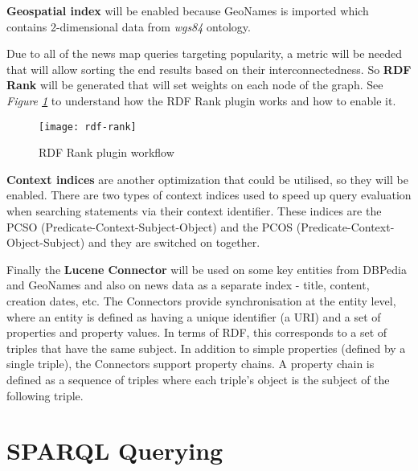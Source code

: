 \textbf{Geospatial index} will be enabled because GeoNames is imported which contains 2-dimensional data from \textit{wgs84} ontology.

Due to all of the news map queries targeting popularity,  a metric will be needed that will allow sorting the end results based on their interconnectedness. So \textbf{RDF Rank} will be generated that will set weights on each node of the graph. See \textit{Figure \ref{rdf-rank}} to understand how the RDF Rank plugin works and how to enable it.

\begin{figure}[h!]
    \texttt{[image: rdf-rank]}
    \caption{RDF Rank plugin workflow}
    \label{rdf-rank}
\end{figure}

\textbf{Context indices} are another optimization that could be utilised, so they will be enabled. There are two types of context indices used to speed up query evaluation when searching statements via their context identifier. These indices are the PCSO (Predicate-Context-Subject-Object) and the PCOS (Predicate-Context-Object-Subject) and they are switched on together.

Finally the \textbf{Lucene Connector} will be used on some key entities from DBPedia and GeoNames and also on news data as a separate index - title, content, creation dates, etc. The Connectors provide synchronisation at the entity level, where an entity is defined as having a unique identifier (a URI) and a set of properties and property values. In terms of RDF, this corresponds to a set of triples that have the same subject. In addition to simple properties (defined by a single triple), the Connectors support property chains. A property chain is defined as a sequence of triples where each triple’s object is the subject of the following triple.

\section{SPARQL Querying}
